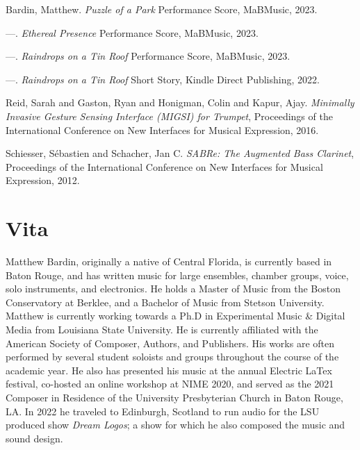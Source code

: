 \begin{thebibliography}{99}

 Bardin, Matthew. \emph{Puzzle of a Park} Performance Score, MaBMusic, 2023.

 ---. \emph{Ethereal Presence} Performance Score, MaBMusic, 2023.

 ---. \emph{Raindrops on a Tin Roof} Performance Score, MaBMusic, 2023.

 ---. \emph{Raindrops on a Tin Roof} Short Story, Kindle Direct Publishing, 2022.

 Reid, Sarah and Gaston, Ryan and Honigman, Colin and Kapur, Ajay. \emph{Minimally Invasive Gesture Sensing Interface (MIGSI) for Trumpet}, Proceedings of the International Conference on New Interfaces for Musical Expression, 2016.

 Schiesser, S{\'e}bastien and Schacher, Jan C. \emph{SABRe: The Augmented Bass Clarinet}, Proceedings of the International Conference on New Interfaces for Musical Expression, 2012.






\end{thebibliography}


\chapter{Vita}

Matthew Bardin, originally a native of Central Florida, is currently based in Baton Rouge, and has written music for large ensembles, chamber groups, voice, solo instruments, and electronics. He holds a Master of Music from the Boston Conservatory at Berklee, and a  Bachelor of Music from Stetson University. Matthew is currently working towards a Ph.D in Experimental Music \& Digital Media from Louisiana State University. He is currently affiliated with the American Society of Composer, Authors, and Publishers. His works are often performed by several student soloists and groups throughout the course of the academic year. He also has presented his music at the annual Electric LaTex festival, co-hosted an online workshop at NIME 2020, and served as the 2021 Composer in Residence of the University Presbyterian Church in Baton Rouge, LA. In 2022 he traveled to Edinburgh, Scotland to run audio for the LSU produced show \textit{Dream Logos}; a show for which he also composed the music and sound design.

